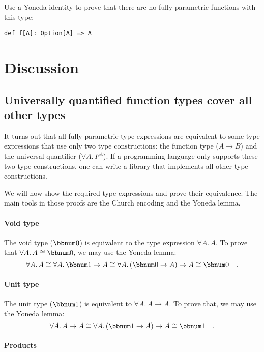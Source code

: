 Use a Yoneda identity to prove that there are no fully parametric
functions with this type:

\begin{lstlisting}
def f[A]: Option[A] => A
\end{lstlisting}

\section{Discussion}

\subsection{Universally quantified function types cover all other types}

It turns out that all fully parametric type expressions are equivalent
to some type expressions that use only two type constructions: the
function type ($A\rightarrow B$) and the universal quantifier ($\forall A.\,F^{A}$).
If a programming language only supports these two type constructions,
one can write a library that implements all other type constructions.

We will now show the required type expressions and prove their equivalence.
The main tools in those proofs are the Church encoding and the Yoneda
lemma.

\paragraph{Void type}

The void type ($\bbnum 0$) is equivalent to the type expression $\forall A.\,A$.
To prove that $\forall A.\,A\cong\bbnum 0$, we may use the Yoneda
lemma:
\[
\forall A.\,A\cong\forall A.\,\bbnum 1\rightarrow A\cong\forall A.\,(\bbnum 0\rightarrow A)\rightarrow A\cong\bbnum 0\quad.
\]


\paragraph{Unit type}

The unit type ($\bbnum 1$) is equivalent to $\forall A.\,A\rightarrow A$.
To prove that, we may use the Yoneda lemma:
\[
\forall A.\,A\rightarrow A\cong\forall A.\,(\bbnum 1\rightarrow A)\rightarrow A\cong\bbnum 1\quad.
\]


\paragraph{Products}

